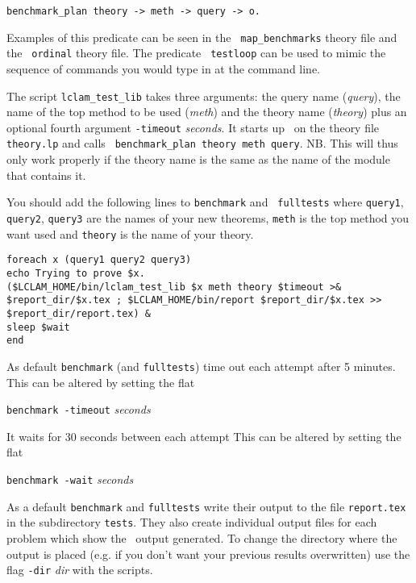 \begin{verbatim}
benchmark_plan theory -> meth -> query -> o.
\end{verbatim}

Examples of this predicate can be seen in the {\tt
  map\_benchmarks} theory file and the {\tt
  ordinal} theory file.  The predicate {\tt
  testloop} can be used to mimic the sequence of
commands you would type in at the command line.

The script {\tt lclam\_test\_lib} takes three
arguments: the query name ({\em query}), the name of the top method to
be used ({\em meth}) and the theory name ({\em theory}) plus an
optional fourth argument {\tt -timeout} {\em seconds}.  It starts up
\lclam\ on the theory file {\tt theory.lp} and calls {\tt
  benchmark\_plan theory meth query}.  NB.  This will thus only work
properly if the theory name is the same as the name of the module that
contains it.

You should add the following lines to {\tt benchmark} and {\tt
  fulltests} where {\tt query1}, {\tt query2}, {\tt query3} are the
names of your new theorems, {\tt meth} is the top method you want used
and {\tt theory} is the name of your theory.

\begin{verbatim}
foreach x (query1 query2 query3)
echo Trying to prove $x.
($LCLAM_HOME/bin/lclam_test_lib $x meth theory $timeout >& $report_dir/$x.tex ; $LCLAM_HOME/bin/report $report_dir/$x.tex >> $report_dir/report.tex) &
sleep $wait
end
\end{verbatim}


As default {\tt benchmark} (and {\tt fulltests}) time out each attempt
after 5 minutes. 
This can be altered by setting the flat

{\tt benchmark -timeout} {\em seconds}

It waits for 30 seconds between each attempt
This can be altered by setting the flat

{\tt benchmark -wait} {\em seconds}

As a default {\tt benchmark} and {\tt fulltests} write their output to 
the file {\tt report.tex} in the subdirectory {\tt tests}.  They also
create individual output files for each problem which show the \lclam\ 
output generated.  To change the directory where the output is placed
(e.g. if you don't want your previous results overwritten) use the
flag {\tt -dir} {\em dir} with the scripts.
